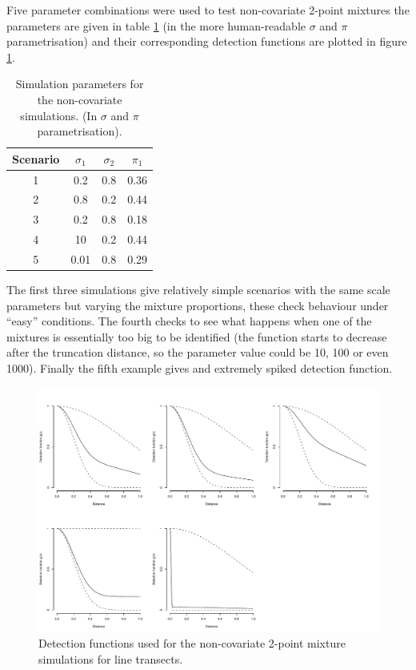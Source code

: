 Five parameter combinations were used to test non-covariate 2-point mixtures the parameters are given in table \ref{mmds-nocov-simtable} (in the more human-readable $\sigma$ and $\pi$ parametrisation) and their corresponding detection functions are plotted in figure \ref{mmds-nocov-funcs}.

\begin{table}[ht]
\centering
\begin{tabular}{c c c c}
Scenario & $\sigma_1$ & $\sigma_2$ & $\pi_1$\\
\hline
\hline
1 & 0.2 & 0.8 &  0.36\\
2 & 0.8 & 0.2 & 0.44\\
3 & 0.2 & 0.8 & 0.18\\
4 & 10  & 0.2 & 0.44\\
5 & 0.01&  0.8 & 0.29\\
\end{tabular}
\label{mmds-nocov-simtable}
\caption{Simulation parameters for the non-covariate simulations. (In $\sigma$ and $\pi$ parametrisation).}
\end{table}

The first three simulations give relatively simple scenarios with the same scale parameters but varying the mixture proportions, these check behaviour under ``easy'' conditions. The fourth checks to see what happens when one of the mixtures is essentially too big to be identified (the function starts to decrease after the truncation distance, so the parameter value could be 10, 100 or even 1000). Finally the fifth example gives and extremely spiked detection function.

\begin{figure}
\centering
\includegraphics[width=6in]{mix/figs/nocov-detfcts.pdf}
\caption{Detection functions used for the non-covariate 2-point mixture simulations for line transects.}
\label{mmds-nocov-funcs}
\end{figure}

